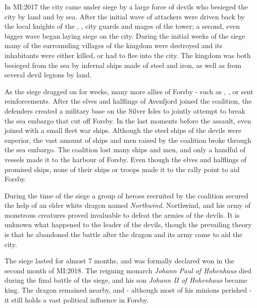 
In MI:2017 the city came under siege by a large force of devils who besieged
the city by land and by sea. After the initial wave of attackers were driven
back by the local knights of the , , city
guards and mages of the tower; a second, even bigger wave began laying siege
on the city. During the initial weeks of the siege many of the surrounding
villages of the kingdom were destroyed and its inhabitants were either killed,
or had to flee into the city. The kingdom was both besieged from the sea by
infernal ships made of steel and iron, as well as from several devil legions
by land.

As the siege dragged on for weeks, many more allies of Forsby - such as
, ,  or
 sent reinforcements. After the elves and halflings of
Avenfjord joined the coalition, the defenders created a military base on the
Silver Isles to jointly attempt to break the sea embargo that cut off
Forsby. In the last moments before the assault, even  joined
with a small fleet war ships. Although the steel ships of the devils were
superior, the vast amount of ships and men raised by the coalition broke
through the sea embargo. The coalition lost many ships and men, and only a
handful of vessels made it to the harbour of Forsby. Even though the elves and
halflings of  promised ships, none of their ships or
troops made it to the rally point to aid Forsby.

During the time of the siege a group of heroes recruited by the coalition
secured the help of an elder white dragon named \emph{Northwind}. Northwind,
and his army of monstrous creatures proved invaluable to defeat the armies of
the devils. It is unknown what happened to the leader of the devils, though
the prevailing theory is that he abandoned the battle after the dragon and its
army came to aid the city.

The siege lasted for almost 7 months, and was formally declared won in the
second month of MI:2018. The reigning monarch \emph{Johann Paul of Hohenhaus}
died during the final battle of the siege, and his son \emph{Johann II of
  Hohenhaus} became king. The dragon remained nearby, and - although most of
his minions perished - it still holds a vast political influence in Forsby.

